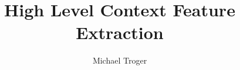 \documentclass[master,english]{hgbthesis}
\title{High Level Context Feature Extraction}
\author{Michael Troger}
\begin{document}

\frontmatter							%

\maketitle
\tableofcontents


			

\mainmatter          			%










\appendix                                         %


\MakeBibliography                        				%



\end{document}
